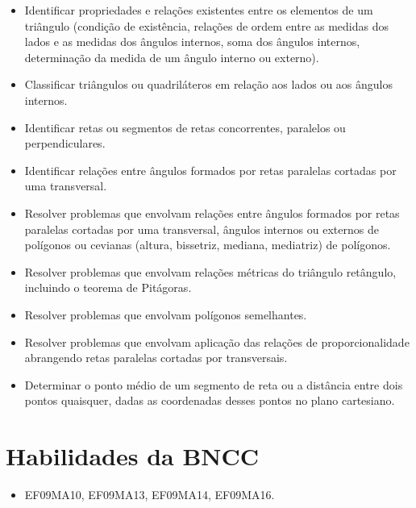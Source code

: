 \begin{escolha}
\begin{escolha}
\begin{escolha}
\begin{escolha}
\begin{itemize}

  \item Identificar propriedades e relações existentes entre os elementos de um
triângulo (condição de existência, relações de ordem entre as medidas dos
lados e as medidas dos ângulos internos, soma dos ângulos internos,
determinação da medida de um ângulo interno ou externo).
  \item Classificar triângulos ou quadriláteros em relação aos lados ou aos
ângulos internos.
  \item Identificar retas ou segmentos de retas concorrentes, paralelos ou
perpendiculares.
  \item Identificar relações entre ângulos formados por retas paralelas cortadas
por uma transversal.
  \item Resolver problemas que envolvam relações entre ângulos formados por
retas paralelas cortadas por uma transversal, ângulos internos ou externos
de polígonos ou cevianas (altura, bissetriz, mediana, mediatriz) de
polígonos.
  \item Resolver problemas que envolvam relações métricas do triângulo
retângulo, incluindo o teorema de Pitágoras.
  \item Resolver problemas que envolvam polígonos semelhantes.
  \item Resolver problemas que envolvam aplicação das relações de
proporcionalidade abrangendo retas paralelas cortadas por transversais.
  \item Determinar o ponto médio de um segmento de reta ou a distância entre
dois pontos quaisquer, dadas as coordenadas desses pontos no plano
cartesiano.

\end{itemize} 

\section{Habilidades da BNCC}

\begin{itemize}
  \item EF09MA10, EF09MA13, EF09MA14, EF09MA16. 
\end{itemize}

\end{escolha}
\end{escolha}
\end{escolha}
\end{escolha}
